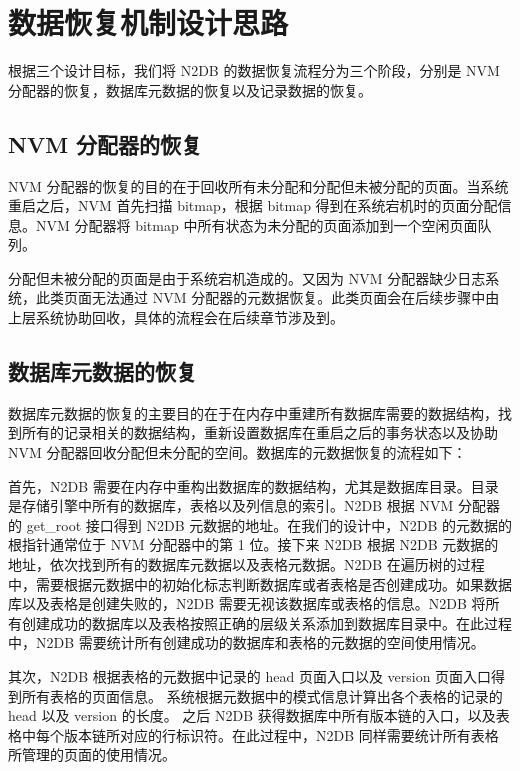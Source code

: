 \section{数据恢复机制设计思路}

根据三个设计目标，我们将 N2DB 的数据恢复流程分为三个阶段，分别是 NVM 分配器的恢复，数据库元数据的恢复以及记录数据的恢复。

\subsection{NVM 分配器的恢复}
\label{ssec:allocator-recovery}

NVM 分配器的恢复的目的在于回收所有未分配和分配但未被分配的页面。当系统重启之后，NVM 首先扫描 bitmap，根据 bitmap 得到在系统宕机时的页面分配信息。NVM 分配器将 bitmap 中所有状态为未分配的页面添加到一个空闲页面队列。

分配但未被分配的页面是由于系统宕机造成的。又因为 NVM 分配器缺少日志系统，此类页面无法通过 NVM 分配器的元数据恢复。此类页面会在后续步骤中由上层系统协助回收，具体的流程会在后续章节涉及到。


\subsection{数据库元数据的恢复}
\label{ssec:metadata-recovery}

数据库元数据的恢复的主要目的在于在内存中重建所有数据库需要的数据结构，找到所有的记录相关的数据结构，重新设置数据库在重启之后的事务状态以及协助 NVM 分配器回收分配但未分配的空间。数据库的元数据恢复的流程如下：

首先，N2DB 需要在内存中重构出数据库的数据结构，尤其是数据库目录。目录是存储引擎中所有的数据库，表格以及列信息的索引。N2DB 根据 NVM 分配器的 get\_root 接口得到 N2DB 元数据的地址。在我们的设计中，N2DB 的元数据的根指针通常位于 NVM 分配器中的第 1 位。接下来 N2DB 根据 N2DB 元数据的地址，依次找到所有的数据库元数据以及表格元数据。N2DB 在遍历树的过程中，需要根据元数据中的初始化标志判断数据库或者表格是否创建成功。如果数据库以及表格是创建失败的，N2DB 需要无视该数据库或表格的信息。N2DB 将所有创建成功的数据库以及表格按照正确的层级关系添加到数据库目录中。在此过程中，N2DB 需要统计所有创建成功的数据库和表格的元数据的空间使用情况。

其次，N2DB 根据表格的元数据中记录的 head 页面入口以及 version 页面入口得到所有表格的页面信息。
系统根据元数据中的模式信息计算出各个表格的记录的 head 以及 version 的长度。
之后 N2DB 获得数据库中所有版本链的入口，以及表格中每个版本链所对应的行标识符。在此过程中，N2DB 同样需要统计所有表格所管理的页面的使用情况。

